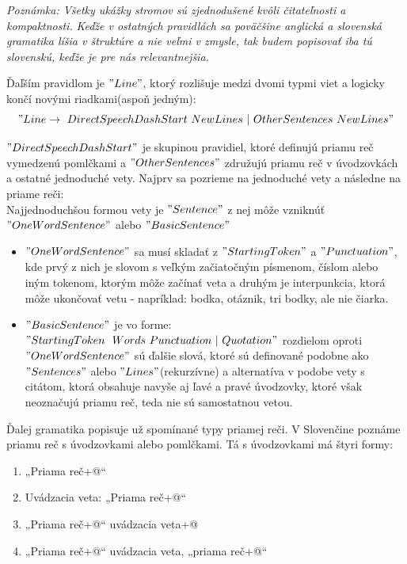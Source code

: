 \documentclass[12pt,a4paper]{report}
\theoremstyle{definition}
\theoremstyle{remark}
\begin{document}
\textit{Poznámka: Všetky ukážky stromov sú zjednodušené kvôli čitateľnosti a kompaktnosti.}
\textit{Keďže v ostatných pravidlách sa poväčšine anglická a slovenská gramatika líšia v štruktúre a nie veľmi v zmysle, tak budem popisovať iba tú slovenskú, keďže je pre nás relevantnejšia.} 

Ďaľším pravidlom je $"Line"$, ktorý rozlišuje medzi dvomi typmi viet a logicky končí novými riadkami(aspoň jedným):
$$"Line \to \ DirectSpeechDashStart \ NewLines \ | \ OtherSentences \ NewLines "$$

\noindent $"DirectSpeechDashStart"$ je skupinou pravidiel, ktoré definujú priamu reč vymedzenú pomlčkami a $"OtherSentences"$ združujú priamu reč v úvodzovkách a ostatné jednoduché vety. Najprv sa pozrieme na jednoduché vety a následne na priame reči: \\


\noindent Najjednoduchšou formou vety je $"Sentence"$ z nej môže vzniknúť \\ $"OneWordSentence"$ alebo $"BasicSentence"$
\begin{itemize}
\item $"OneWordSentence"$ sa musí skladať z $"StartingToken"$ a $"Punctuation"$, kde prvý z nich je slovom s veľkým začiatočným písmenom, číslom alebo iným tokenom, ktorým môže začínať veta a druhým je interpunkcia, ktorá môže ukončovať vetu - napríklad: bodka, otáznik, tri bodky, ale nie čiarka.
\item $"BasicSentence"$ je vo forme: $"StartingToken \ \ Words \ Punctuation \ | \ Quotation"$
	rozdielom oproti $"OneWordSentence"$ sú ďalšie slová, ktoré sú definované podobne ako $"Sentences"$ alebo $"Lines"$(rekurzívne) a alternatíva v podobe vety s citátom, ktorá obsahuje navyše aj ľavé a pravé úvodzovky, ktoré však neoznačujú priamu reč, teda nie sú samostatnou vetou.
\end{itemize}

Ďalej gramatika popisuje už spomínané typy priamej reči. V Slovenčine poznáme priamu reč s úvodzovkami  alebo pomlčkami. Tá s úvodzovkami má štyri formy:
\begin{enumerate}[leftmargin=*]
\item „Priama reč\verb@[.?!]+@“
\item Uvádzacia veta: „Priama reč\verb@[.?!]+@“
\item „Priama reč\verb@[,?!]+@“ uvádzacia veta\verb@[.?!]+@
\item „Priama reč\verb@[,?!]+@“ uvádzacia veta, „priama reč\verb@[.?!]+@“
\end{enumerate}
\end{document}
